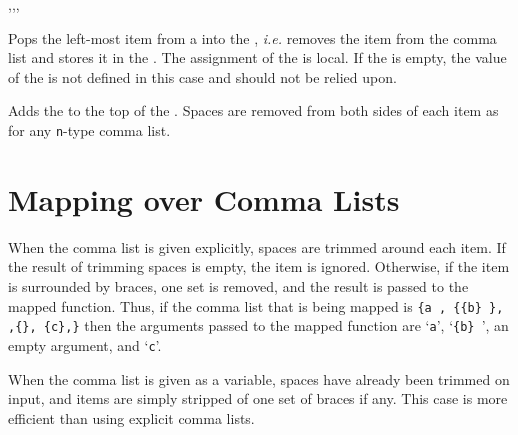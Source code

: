 \documentclass[oneside]{book}
\begin{document}
\begin{function}{\ClistPop,\ClistPopT,\ClistPopF,\ClistPopTF}
\begin{syntax}
  
   
   
    
\end{syntax}
Pops the left-most item from a  into the
, \emph{i.e.} removes the item from the
comma list and stores it in the .
The assignment of the  is local.
If the  is empty,
the value of the  is
not defined in this case and should not be relied upon. 
\end{function}
 
\begin{function}{\ClistPush}
\begin{syntax}
  
\end{syntax}
Adds the  to the top of the .
Spaces are removed from both sides of each item as for any
\texttt{n}-type comma list.
\end{function}

\section{Mapping over Comma Lists}
 
 
When the comma list is given explicitly, %
spaces are trimmed around each item.
If the result of trimming spaces is empty, the item is ignored.
Otherwise, if the item is surrounded by braces, one set is removed,
and the result is passed to the mapped function. Thus, if the
comma list that is being mapped is \verb*|{a , {{b} }, ,{}, {c},}|
then the arguments passed to the mapped function are
`\verb*|a|', `\verb*|{b} |', an empty argument, and `\verb*|c|'.
 
When the comma list is given as a variable, spaces
have already been trimmed on input, and items are simply stripped
of one set of braces if any. This case is more efficient than using
explicit comma lists.
\end{document}
